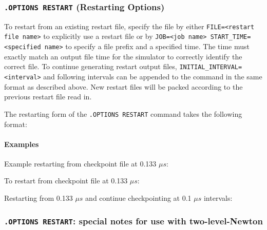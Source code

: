 
\subsubsection{\texttt{.OPTIONS RESTART} (Restarting Options)}

To restart from an existing restart file, specify the file
by either \texttt{FILE=<restart file name>} to explicitly use a restart file or
by \texttt{JOB=<job name> START\_TIME=<specified name>} to specify a file
prefix and a specified time.  The time must exactly match an output file time
for the simulator to correctly identify the correct file.  To continue
generating restart output files, \texttt{INITIAL\_INTERVAL=<interval>} and
following intervals can be appended to the command in the same format as
described above.  New restart files will be packed according to the previous
restart file read in.  

The restarting form of the \texttt{.OPTIONS RESTART} command takes the following format:


\paragraph{Examples}

Example restarting from checkpoint file at 0.133 $\mu s$:

To restart from checkpoint file at 0.133 $\mu s$:

Restarting from 0.133 $\mu s$ and continue checkpointing at 0.1 $\mu s$
intervals:

\subsubsection{\texttt{.OPTIONS RESTART}: special notes for use with two-level-Newton}

